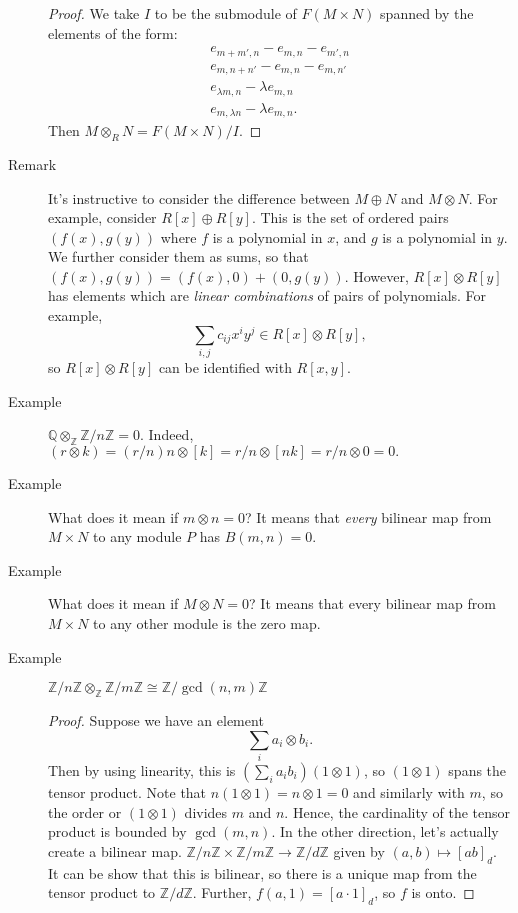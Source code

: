 \documentclass[12pt]{article}
\newcommand{\bbQ}{\mathbb{Q}}
\newcommand{\bbZ}{\mathbb{Z}}
\begin{document}
\begin{description}
\begin{proof}
We take $I$ to be the submodule of $F(M\times N)$ spanned by the
elements of the form:
\begin{align*}
  e_{m+m',n}-e_{m,n}-e_{m',n} \\
  e_{m,n+n'}-e_{m,n}-e_{m,n'}\\
e_{\lambda m, n} - \lambda e_{m,n}\\
e_{m,\lambda n}-\lambda e_{m,n}.
\end{align*}
Then $M\otimes_R N = F(M\times N)/I$. 
    \end{proof}
  \item[Remark] It's instructive to consider the difference between
    $M\oplus N$ and $M\otimes N$. For example, consider $R[x]\oplus
    R[y]$. This is the set of ordered pairs $(f(x), g(y))$ where $f$
    is a polynomial in $x$, and $g$ is a polynomial in $y$. We further
    consider them as sums, so that
    $(f(x),g(y))=(f(x),0)+(0,g(y))$. However, $R[x]\otimes R[y]$ has
    elements which are \emph{linear combinations} of pairs of
    polynomials. For example, \[\sum_{i,j} c_{ij}x^i y^j\in
      R[x]\otimes R[y],\] so $R[x]\otimes R[y]$ can be identified with
    $R[x,y]$. 
  \item[Example] $\bbQ\otimes_\bbZ \bbZ/n\bbZ=0$. Indeed, $(r\otimes
    k) = (r/n)n \otimes [k] = r/n \otimes [nk]=r/n\otimes 0 = 0.$
\item[Example] What does it mean if $m\otimes n=0$? It means that
  \emph{every} bilinear map from $M\times N$ to any module $P$ has
  $B(m,n)=0$. 
\item[Example] What does it mean if $M\otimes N=0$? It means that
  every bilinear map from $M\times N$ to any other module is the zero
  map. 
\item[Example] $\bbZ/n\bbZ \otimes_\bbZ \bbZ/m\bbZ\cong \bbZ/\gcd(n,m)\bbZ$
  \begin{proof}
    Suppose we have an element \[\sum_{i} a_i \otimes b_i.\] Then by
    using linearity, this is $(\sum_i a_ib_i)(1\otimes 1)$, so
    $(1\otimes 1)$ spans the tensor product. Note that $n(1\otimes
    1)=n\otimes 1=0$ and similarly with $m$, so the order or
    $(1\otimes 1)$ divides $m$ and $n$. Hence, the cardinality of the
    tensor product is bounded by $\gcd(m,n)$. 
In the other direction, let's actually create a bilinear
map. $\bbZ/n\bbZ\times \bbZ/m\bbZ \rightarrow \bbZ/d\bbZ$ given by
$(a,b) \mapsto [ab]_d$. It can be show that this is bilinear, so there
is a unique map from the tensor product to $\bbZ/d\bbZ$. Further,
$f(a,1)=[a\cdot 1]_d$, so $f$ is onto. 
  \end{proof}

\end{description}
\end{document}
